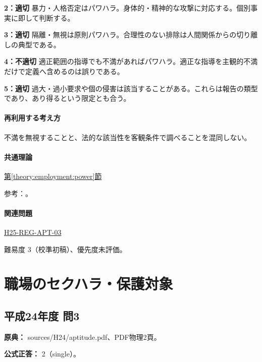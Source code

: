 \noindent\textbf{2：適切} 暴力・人格否定はパワハラ。身体的・精神的な攻撃に対応する。個別事実に即して判断する。\par

\noindent\textbf{3：適切} 隔離・無視は原則パワハラ。合理性のない排除は人間関係からの切り離しの典型である。\par

\noindent\textbf{4：不適切} 適正範囲の指導でも不満があればパワハラ。適正な指導を主観的不満だけで定義へ含めるのは誤りである。\par

\noindent\textbf{5：適切} 過大・過小要求や個の侵害は該当することがある。これらは報告の類型であり、あり得るという限定とも合う。\par

\paragraph{再利用する考え方} 不満を無視することと、法的な該当性を客観条件で調べることを混同しない。

\paragraph{共通理論} \hyperref[theory:employment:power]{第\ref*{theory:employment:power}節}

\par 参考：\cite{employment_power2012,employment_power_current}。

\paragraph{関連問題} \hyperref[q:h25-reg-apt-03]{H25-REG-APT-03}

\par 難易度 3（校準初稿）、優先度未評価。

\section{職場のセクハラ・保護対象}

\subsection{平成24年度 問3}
\label{q:h24-reg-apt-03}

\noindent\textbf{原典：} sources/H24/aptitude.pdf、PDF物理2頁。

\textbf{公式正答：} 2（single）。

